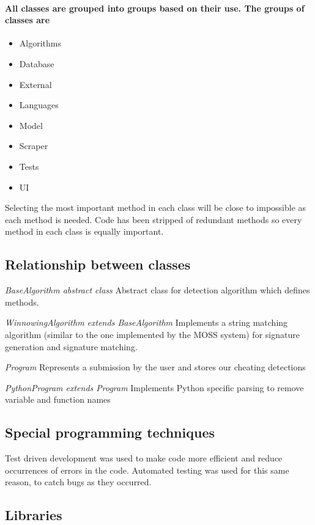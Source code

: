\documentclass[11pt,a4paper]{article}
\begin{document}
\paragraph{All classes are grouped into groups based on their use. The groups of
classes are}
\begin{itemize}
\item Algorithms
\item Database
\item External
\item Languages
\item Model
\item Scraper
\item Tests 
\item UI
\end{itemize}

Selecting the most important method in each class will be close to impossible as each method is needed. Code has been stripped of redundant methods so every method in each class is equally important.

\subsection{Relationship between classes}

\textit{BaseAlgorithm abstract class}
Abstract class for detection algorithm which defines methods.

\textit{WinnowingAlgorithm extends BaseAlgorithm}
Implements a string matching algorithm (similar to the one implemented by the MOSS
system) for signature generation and signature matching.

\textit{Program}
Represents a submission by the user and stores our cheating detections

\textit{PythonProgram extends Program}
Implements Python specific parsing to remove variable and function names

\subsection{Special programming techniques}

Test driven development was used to make code more efficient and reduce occurrences of errors in the code. Automated testing was used for this same reason, to catch bugs as they occurred.

\subsection{Libraries}
\end{document}
